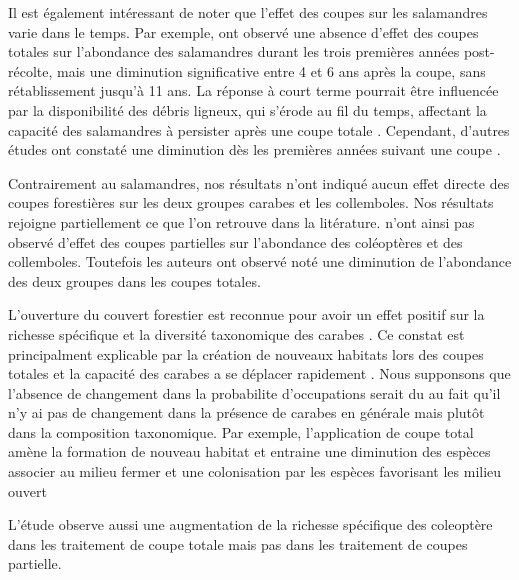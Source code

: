 %




Il est également intéressant de noter que l'effet des coupes sur les salamandres varie dans le temps. Par exemple, \cite{Ochs2022Responseterrestrial} ont observé une absence d'effet des coupes totales sur l'abondance des salamandres durant les trois premières années post-récolte, mais une diminution significative entre 4 et 6 ans après la coupe, sans rétablissement jusqu'à 11 ans. La réponse à court terme pourrait être influencée par la disponibilité des débris ligneux, qui s'érode au fil du temps, affectant la capacité des salamandres à persister après une coupe totale \citep{Ochs2022Responseterrestrial}. Cependant, d'autres études ont constaté une diminution dès les premières années suivant une coupe \citep{deMaynadier1995relationshipforest,Macneil2014Effectstimber}.


%




Contrairement au salamandres, nos résultats n'ont indiqué aucun effet directe des coupes forestières sur les deux groupes carabes et les collemboles. 
Nos résultats rejoigne partiellement ce que l'on retrouve dans la litérature.
\cite{Kudrin2023metaanalysiseffects} n'ont ainsi pas observé d'effet des coupes partielles sur l'abondance des coléoptères et des collemboles.
Toutefois les auteurs ont observé noté une diminution de l'abondance des deux groupes dans les coupes totales. 

L'ouverture du couvert forestier est reconnue pour avoir un effet positif sur la richesse spécifique et la diversité taxonomique des carabes \citep{Kudrin2023metaanalysiseffects}.
Ce constat est principalment explicable par la création de nouveaux habitats lors des coupes totales et la capacité des carabes a se déplacer rapidement \citep{Niemela2007effectsforestry}. 
Nous supponsons que l'absence de changement dans la probabilite d'occupations serait du au fait qu'il n'y ai pas de changement dans la présence de carabes en générale mais plutôt dans la composition taxonomique.
Par exemple, l'application de coupe total amène la formation de nouveau habitat et entraine une diminution des espèces associer au milieu fermer et une colonisation par les espèces favorisant les milieu ouvert \citep{Niemela2007effectsforestry,Pohl2007Rovebeetles}

L'étude observe aussi une augmentation de la richesse spécifique des coleoptère dans les traitement de coupe totale mais pas dans les traitement de coupes partielle. 

